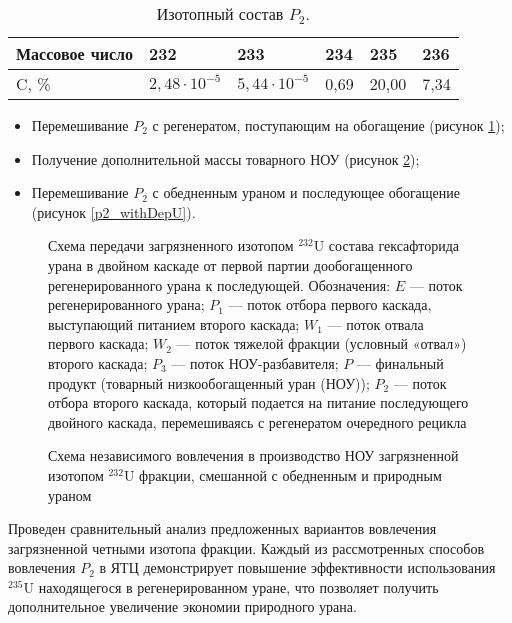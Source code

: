\begin{table}[h]
  \centering
  \caption{{Изотопный состав $P_2$.{\label{P2_compositions_autoref}}}}
  \fontsize{7pt}{7pt}\selectfont
    \begin{tabularx}{\textwidth}{|Y|Y|Y|Y|Y|Y|}
    \hline Массовое число & 232 & 233 & 234 & 235 & 236 \\
    \hline C, \% & $2,48\cdot10^{-5}$ & $5,44\cdot10^{-5}$ & 0,69 & 20,00 & 7,34 \\ \hline
  \end{tabularx}
\end{table}

\begin{itemize}
  \item Перемешивание $P_2$ с регенератом, поступающим на обогащение (рисунок \ref{P2utilizationRingautoref});
  \item Получение дополнительной массы товарного НОУ (рисунок \ref{P2utilizationautoref});
  \item Перемешивание $P_2$ с обедненным ураном и последующее обогащение (рисунок \ref{p2_withDepU}).
\end{itemize}

\begin{figure}[ht]
  \caption{Схема передачи загрязненного изотопом $^{232}$U состава гексафторида урана в двойном каскаде от первой партии дообогащенного регенерированного урана к последующей. Обозначения: $E$ --- поток регенерированного урана; $P_1$ --- поток отбора первого каскада, выступающий питанием второго каскада; $W_1$ --- поток отвала первого каскада; $W_2$ --- поток тяжелой фракции (условный «отвал») второго каскада; $P_3$ --- поток НОУ-разбавителя; $P$ --- финальный продукт (товарный низкообогащенный уран (НОУ)); $P_2$ --- поток отбора второго каскада, который подается на питание последующего двойного каскада, перемешиваясь с регенератом очередного рецикла}\label{P2utilizationRingautoref}
\end{figure}

\begin{figure}[ht]
  \caption{Схема независимого вовлечения в производство НОУ загрязненной изотопом $^{232}$U фракции, смешанной с обедненным и природным ураном}\label{P2utilizationautoref}
\end{figure}

Проведен сравнительный анализ предложенных вариантов вовлечения загрязненной четными изотопа фракции. Каждый из рассмотренных способов вовлечения $P_2$ в ЯТЦ демонстрирует повышение эффективности использования $^{235}$U находящегося в регенерированном уране, что позволяет получить дополнительное увеличение экономии природного урана.

